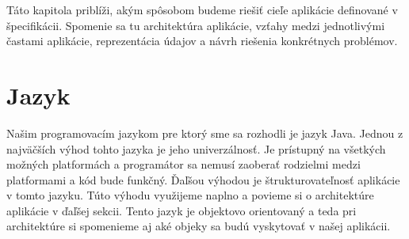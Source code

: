 Táto kapitola priblíži, akým spôsobom budeme riešiť cieľe aplikácie definované v špecifikácii. Spomenie sa tu architektúra aplikácie, vzťahy medzi jednotlivými častami aplikácie, reprezentácia údajov a návrh riešenia konkrétnych problémov.\par
\section{Jazyk}
Našim programovacím jazykom pre ktorý sme sa rozhodli je jazyk Java. Jednou z najväčších výhod tohto jazyka je jeho univerzálnosť. Je prístupný na všetkých možných platformách a programátor sa nemusí zaoberať rodzielmi medzi platformami a kód bude funkčný. Ďaľšou výhodou je štrukturovateľnosť aplikácie v tomto jazyku. Túto výhodu využijeme naplno a povieme si o architektúre aplikácie v ďaľšej sekcii. Tento jazyk je objektovo orientovaný a teda pri architektúre si spomenieme aj aké objeky sa budú vyskytovať v našej aplikácii.
